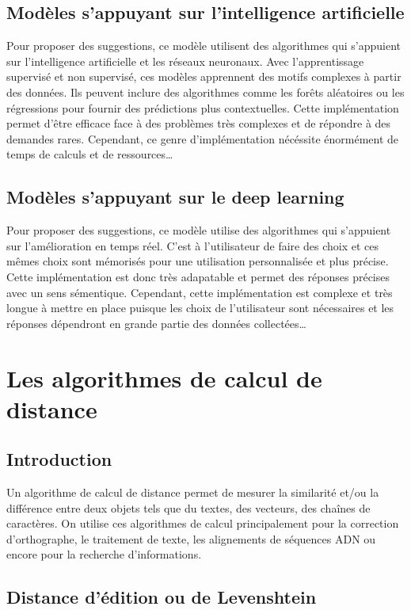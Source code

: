 \documentclass[a4paper, 11pt]{report}
\begin{document}
\section{Modèles s'appuyant sur l'intelligence artificielle}
Pour proposer des suggestions, ce modèle utilisent des algorithmes qui s'appuient sur l'intelligence artificielle et les réseaux neuronaux.
Avec l’apprentissage supervisé et non supervisé, ces modèles apprennent des motifs complexes à partir des données. Ils peuvent inclure des algorithmes comme les forêts aléatoires ou les régressions pour fournir des prédictions plus contextuelles.
Cette implémentation permet d'être efficace face à des problèmes très complexes et de répondre à des demandes rares. Cependant, ce genre d'implémentation nécéssite énormément de temps de calculs et de ressources\dots


\section{Modèles s'appuyant sur le deep learning}
Pour proposer des suggestions, ce modèle utilise des algorithmes qui s'appuient sur l'amélioration en temps réel. C'est à l'utilisateur de faire des choix et ces mêmes choix sont mémorisés pour une utilisation personnalisée et plus précise. Cette implémentation est donc très adapatable et permet des réponses précises avec un sens sémentique. Cependant, cette implémentation est complexe et très longue à mettre en place puisque les choix de l'utilisateur sont nécessaires et les réponses dépendront en grande partie des données collectées\dots



\chapter{Les algorithmes de calcul de distance}

\section{Introduction}

Un algorithme de calcul de distance permet de mesurer la similarité et/ou la différence entre deux objets tels que du textes, des vecteurs, des chaînes de caractères. On utilise ces algorithmes de calcul principalement pour la correction d'orthographe, le traitement de texte, les alignements de séquences ADN ou encore pour la recherche d'informations.

\section{Distance d'édition ou de Levenshtein}
\end{document}

